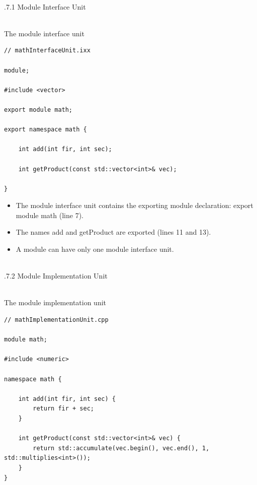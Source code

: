 \hspace*{\fill} \\ %
.7.1\hspace{0.2cm} Module Interface Unit

\hspace*{\fill} \\ %
\noindent
The module interface unit
\begin{lstlisting}[style=styleCXX]
// mathInterfaceUnit.ixx

module;

#include <vector>

export module math;

export namespace math {

	int add(int fir, int sec);
	
	int getProduct(const std::vector<int>& vec);

}
\end{lstlisting}

\begin{itemize}
\item 
The module interface unit contains the exporting module declaration: export module math (line 7).

\item 
The names add and getProduct are exported (lines 11 and 13).

\item 
A module can have only one module interface unit.
\end{itemize}

\hspace*{\fill} \\ %
.7.2\hspace{0.2cm} Module Implementation Unit

\hspace*{\fill} \\ %
\noindent
The module implementation unit
\begin{lstlisting}[style=styleCXX]
// mathImplementationUnit.cpp

module math;

#include <numeric>

namespace math {

	int add(int fir, int sec) {
		return fir + sec;
	}
	
	int getProduct(const std::vector<int>& vec) {
		return std::accumulate(vec.begin(), vec.end(), 1, std::multiplies<int>());
	}
}
\end{lstlisting}

